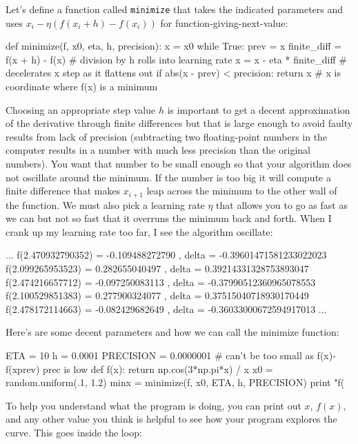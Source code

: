 \documentclass[titlepage]{tufte-book}
\begin{document}
\begin{fullwidth}
\noindent Let's define a function called {\tt minimize} that takes the indicated parameters and uses $x_i - \eta (f(x_{i}+h) - f(x_{i}))$ for function-giving-next-value:

\begin{pyverbatim}
def minimize(f, x0, eta, h, precision):
    x = x0
    while True:
        prev = x
        finite_diff = f(x + h) - f(x)	 # division by h rolls into learning rate
        x = x - eta * finite_diff 		# decelerates x step as it flattens out
        if abs(x - prev) < precision:
            return x   # x is coordinate where f(x) is a minimum
\end{pyverbatim}

Choosing an appropriate step value $h$ is important to get a decent approximation of the derivative through finite differences but that is large enough to avoid faulty results from lack of precision (subtracting two floating-point numbers in the computer results in a number with much less precision than the original numbers). You want that number to be small enough so that your algorithm does not oscillate around the minimum. If the number is too big it will compute a finite difference that makes $x_{i+1}$ leap across the minimum to the other wall of the function.  We must also pick a learning rate $\eta$ that allows you to go as fast as we can but not so fast that it overruns the minimum back and forth. When I crank up my learning rate too far, I see the algorithm oscillate:

\begin{pyverbatim}
...
f(2.470932790352) = -0.109488272790 , delta = -0.39601471581233022023
f(2.099265953523) = 0.282655040497 , delta = 0.39214331328753893047
f(2.474216657712) = -0.097250083113 , delta = -0.37990512360965078553
f(2.100529851383) = 0.277900324077 , delta = 0.37515040718930170449
f(2.478172114663) = -0.082429682649 , delta = -0.36033000672594917013
...
\end{pyverbatim}

\noindent Here's are some decent parameters and how we can call the minimize function:

\begin{pyverbatim}
ETA = 10
h = 0.0001
PRECISION = 0.0000001 # can't be too small as f(x)-f(xprev) prec is low
def f(x): return np.cos(3*np.pi*x) / x
x0 = random.uniform(.1, 1.2)
minx = minimize(f, x0, ETA, h, PRECISION)
print "f(%
\end{pyverbatim}

To help you understand what the program is doing, you can print out $x$, $f(x)$, and any other value you think is helpful to see how your program explores the curve. This goes inside the loop:


\end{fullwidth}
\end{document}
